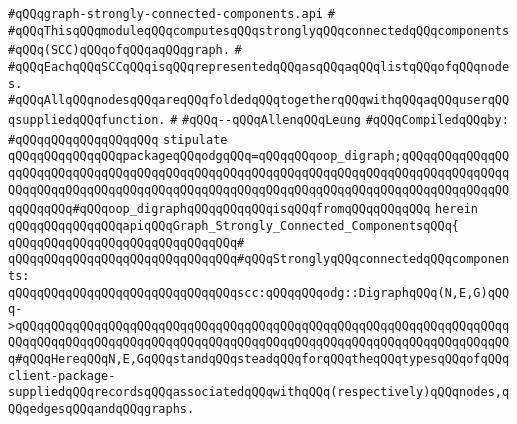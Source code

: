 \label{src/lib/graph/graph-strongly-connected-components.api}
\verb|#qQQqgraph-strongly-connected-components.api|\newline
\verb|#|\newline
\verb|#qQQqThisqQQqmoduleqQQqcomputesqQQqstronglyqQQqconnectedqQQqcomponents|\newline
\verb|#qQQq(SCC)qQQqofqQQqaqQQqgraph.|\newline
\verb|#|\newline
\verb|#qQQqEachqQQqSCCqQQqisqQQqrepresentedqQQqasqQQqaqQQqlistqQQqofqQQqnodes.|\newline
\verb|#qQQqAllqQQqnodesqQQqareqQQqfoldedqQQqtogetherqQQqwithqQQqaqQQquserqQQqsuppliedqQQqfunction.|\newline
\verb|#|\newline
\verb|#qQQq--qQQqAllenqQQqLeung|\newline
\newline
\verb|#qQQqCompiledqQQqby:|\newline
\verb|#qQQqqQQqqQQqqQQqqQQq|\newline
\newline
\newline
\newline
\verb|stipulate|\newline
\verb|qQQqqQQqqQQqqQQqpackageqQQqodgqQQq=qQQqqQQqoop_digraph;qQQqqQQqqQQqqQQqqQQqqQQqqQQqqQQqqQQqqQQqqQQqqQQqqQQqqQQqqQQqqQQqqQQqqQQqqQQqqQQqqQQqqQQqqQQqqQQqqQQqqQQqqQQqqQQqqQQqqQQqqQQqqQQqqQQqqQQqqQQqqQQqqQQqqQQqqQQqqQQqqQQq#qQQqoop_digraphqQQqqQQqqQQqisqQQqfromqQQqqQQqqQQq|\newline
\verb|herein|\newline
\newline
\verb|qQQqqQQqqQQqqQQqapiqQQqGraph_Strongly_Connected_ComponentsqQQq{|\newline
\verb|qQQqqQQqqQQqqQQqqQQqqQQqqQQqqQQq#|\newline
\verb|qQQqqQQqqQQqqQQqqQQqqQQqqQQqqQQq#qQQqStronglyqQQqconnectedqQQqcomponents:|\newline
\newline
\verb|qQQqqQQqqQQqqQQqqQQqqQQqqQQqqQQqscc:qQQqqQQqodg::DigraphqQQq(N,E,G)qQQq->qQQqqQQqqQQqqQQqqQQqqQQqqQQqqQQqqQQqqQQqqQQqqQQqqQQqqQQqqQQqqQQqqQQqqQQqqQQqqQQqqQQqqQQqqQQqqQQqqQQqqQQqqQQqqQQqqQQqqQQqqQQqqQQqqQQqqQQqqQQq#qQQqHereqQQqN,E,GqQQqstandqQQqsteadqQQqforqQQqtheqQQqtypesqQQqofqQQqclient-package-suppliedqQQqrecordsqQQqassociatedqQQqwithqQQq(respectively)qQQqnodes,qQQqedgesqQQqandqQQqgraphs.|\newline
